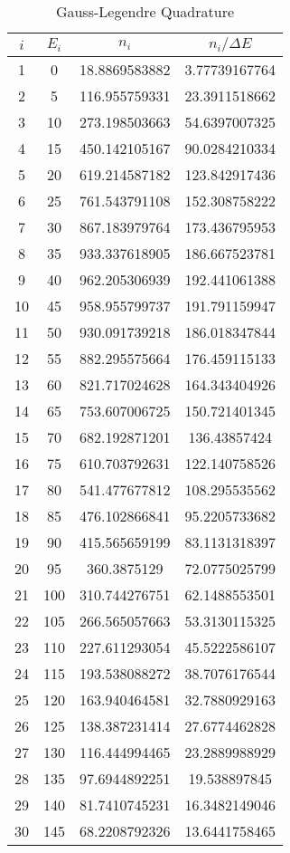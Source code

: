 \begin{table}[h]
\centering
\begin{tabular}{cccc}
\hline\hline
$i$ & $E_i$ & $n_i$ & $n_i/\Delta E$ \\
\hline
1 & 0 & 18.8869583882 & 3.77739167764 \\
2 & 5 & 116.955759331 & 23.3911518662 \\
3 & 10 & 273.198503663 & 54.6397007325 \\
4 & 15 & 450.142105167 & 90.0284210334 \\
5 & 20 & 619.214587182 & 123.842917436 \\
6 & 25 & 761.543791108 & 152.308758222 \\
7 & 30 & 867.183979764 & 173.436795953 \\
8 & 35 & 933.337618905 & 186.667523781 \\
9 & 40 & 962.205306939 & 192.441061388 \\
10 & 45 & 958.955799737 & 191.791159947 \\
11 & 50 & 930.091739218 & 186.018347844 \\
12 & 55 & 882.295575664 & 176.459115133 \\
13 & 60 & 821.717024628 & 164.343404926 \\
14 & 65 & 753.607006725 & 150.721401345 \\
15 & 70 & 682.192871201 & 136.43857424 \\
16 & 75 & 610.703792631 & 122.140758526 \\
17 & 80 & 541.477677812 & 108.295535562 \\
18 & 85 & 476.102866841 & 95.2205733682 \\
19 & 90 & 415.565659199 & 83.1131318397 \\
20 & 95 & 360.3875129 & 72.0775025799 \\
21 & 100 & 310.744276751 & 62.1488553501 \\
22 & 105 & 266.565057663 & 53.3130115325 \\
23 & 110 & 227.611293054 & 45.5222586107 \\
24 & 115 & 193.538088272 & 38.7076176544 \\
25 & 120 & 163.940464581 & 32.7880929163 \\
26 & 125 & 138.387231414 & 27.6774462828 \\
27 & 130 & 116.444994465 & 23.2889988929 \\
28 & 135 & 97.6944892251 & 19.538897845 \\
29 & 140 & 81.7410745231 & 16.3482149046 \\
30 & 145 & 68.2208792326 & 13.6441758465 \\
\hline\hline
\end{tabular}
\label{tb3}
\caption{Gauss-Legendre Quadrature}
\end{table}

